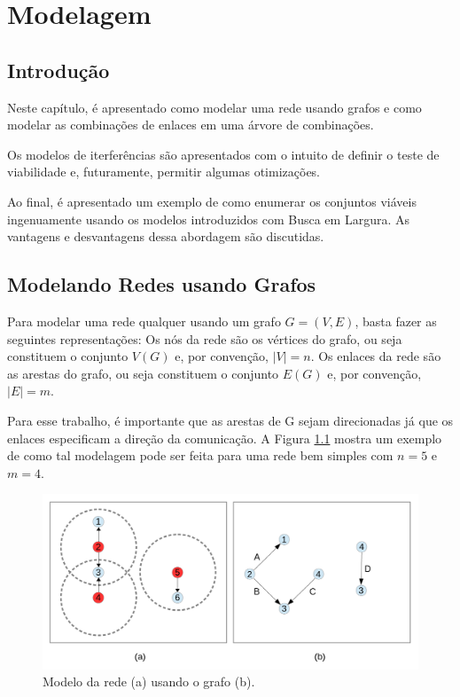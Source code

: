 \chapter{Modelagem}
\label{cap:modelagem}

\section{Introdução}

Neste capítulo, é apresentado como modelar uma rede usando grafos e como modelar as combinações de enlaces em uma árvore de combinações. 

Os modelos de iterferências são apresentados com o intuito de definir o teste de viabilidade e, futuramente, permitir algumas otimizações.

Ao final, é apresentado um exemplo de como enumerar os conjuntos viáveis ingenuamente usando os modelos introduzidos com Busca em Largura. As vantagens e desvantagens dessa abordagem são discutidas.

\section{Modelando Redes usando Grafos}

Para modelar uma rede qualquer usando um grafo $G=(V,E)$, basta fazer as seguintes representações: Os nós da rede são os vértices do grafo, ou seja constituem o conjunto $V(G)$ e, por convenção, $|V|=n$. Os enlaces da rede são as arestas do grafo, ou seja constituem o conjunto $E(G)$ e, por convenção, $|E|=m$.

Para esse trabalho, é importante que as arestas de G sejam direcionadas já que os enlaces especificam a direção da comunicação. A Figura \ref{fig:grafo} mostra um exemplo de como tal modelagem pode ser feita para uma rede bem simples com $n=5$ e $m=4$.

\begin{figure}[htb]
\centering
\includegraphics[width=1\textwidth]{figs/grafo}
\caption[Modelo da rede (a) usando o grafo (b).]
{Modelo da rede (a) usando o grafo (b).}
\label{fig:grafo}
\end{figure}

